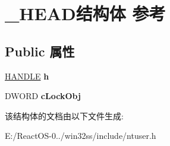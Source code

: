 \hypertarget{struct___h_e_a_d}{}\section{\+\_\+\+H\+E\+A\+D结构体 参考}
\label{struct___h_e_a_d}
\subsection*{Public 属性}
\begin{DoxyCompactItemize}
\item 
\mbox{\label{struct___h_e_a_d_aade15d8ea82f5d1a725b813f9e54f18b}} 
\hyperlink{interfacevoid}{H\+A\+N\+D\+LE} {\bfseries h}
\item 
\mbox{\label{struct___h_e_a_d_a36b17edb042f37f2b9582ba18acc3766}} 
D\+W\+O\+RD {\bfseries c\+Lock\+Obj}
\end{DoxyCompactItemize}


该结构体的文档由以下文件生成\+:\begin{DoxyCompactItemize}
\item 
E\+:/\+React\+O\+S-\/0../win32ss/include/ntuser.\+h\end{DoxyCompactItemize}
